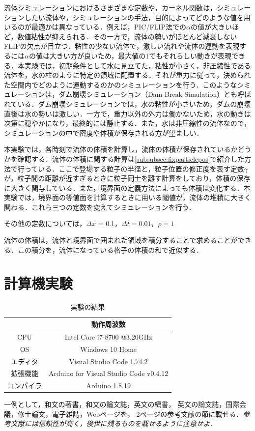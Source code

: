 \documentclass[a4j,12pt]{jreport}
\begin{document}
流体シミュレーションにおけるさまざまな定数や，カーネル関数は，シミュレーションしたい流体や，シミュレーションの手法，目的によってどのような値を用いるのが最適かは異なっている．例えば，PIC/FLIP法での$\alpha$の値が大きいほど，数値粘性が抑えられる．その一方で，流体の勢いがほとんど減衰しないFLIPの欠点が目立つ．粘性の少ない流体で，激しい流れや流体の運動を表現するには$\alpha$の値は大きい方が良いため，最大値の1でもそれらしい動きが表現できる．本実験では，初期条件として水に見立てた，粘性が小さく，非圧縮性である流体を，水の柱のように特定の領域に配置する．それが重力に従って，決められた空間内でどのように運動するのかのシミュレーションを行う．このようなシミュレーションは，ダム崩壊シミュレーション（Dam Break Simulation）とも呼ばれている．ダム崩壊シミュレーションでは，水の粘性が小さいため，ダムの崩壊直後は水の勢いは激しい．一方で，重力以外の外力は働かないため，水の動きは次第に穏やかになり，最終的には静止する．また，水は非圧縮性の流体なので，シミュレーションの中で密度や体積が保存される方が望ましい．

本実験では，各時刻で流体の体積を計算し，流体の体積が保存されているかどうかを確認する．流体の体積に関する計算は\ref{subsubsec:fixparticlepos}で紹介した方法で行っている．ここで登場する粒子の半径と，粒子位置の修正度を表す定数$\gamma$が，粒子間の距離が近すぎるときに粒子同士を離す計算をしており，体積の保存に大きく関与している．また，境界面の定義方法によっても体積は変化する．本実験では，境界面の等値面を計算するときに用いる閾値が，流体の堆積に大きく関わる．これら三つの定数を変えてシミュレーションを行う．

その他の定数については，$\varDelta x$ = 0.1，$\varDelta t = 0.01$，$\rho = 1$

流体の体積は，流体と境界面で囲まれた領域を積分することで求めることができる．この積分を，流体になっている格子の体積の和で近似する．

\chapter{計算機実験} \label{chapter:5}

\begin{table}[H]
    \centering
    \caption{実験の結果} \label{table:実験の結果}
    \begin{tabular}{|c|c|} \hline
                 & 動作周波数                             \\ \hline\hline
      CPU        & Intel Core i7-8700 @3.20GHz            \\
      OS         & Windows 10 Home                        \\
      エディタ   & Visual Studio Code 1.74.2              \\
      拡張機能   & Arduino for Visual Studio Code v0.4.12 \\
      コンパイラ & Arduino 1.8.19                         \\ \hline
    \end{tabular}
  \end{table}
一例として，和文の著書\cite{suetake}，和文の論文誌\cite{kusano}，英文の編書\cite{fuortes}，
英文の論文誌\cite{rice}，国際会議\cite{guibas}，修士論文\cite{chudai}，電子雑誌\cite{iwama}，Webページ\cite{IPSJ}を，
2ページの参考文献の節に載せる．{\em 参考文献には信頼性が高く，後世に残るものを載せるように注意せよ．}
\end{document}
